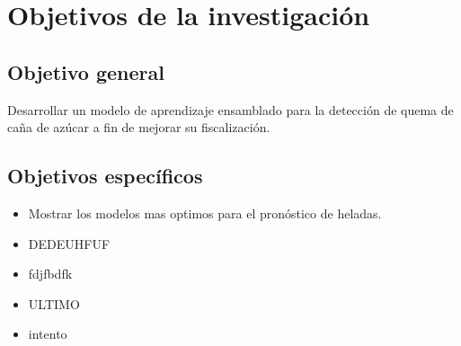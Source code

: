 \section{Objetivos de la investigación}
\subsection{Objetivo general}
Desarrollar un modelo de aprendizaje ensamblado para la detección de quema de caña de azúcar a fin de mejorar su fiscalización.
\subsection{Objetivos específicos}
\begin{itemize}    
    \item Mostrar los modelos mas optimos para el pronóstico de heladas.
    \item DEDEUHFUF
    \item fdjfbdfk
    \item ULTIMO
    \item intento
\end{itemize}
